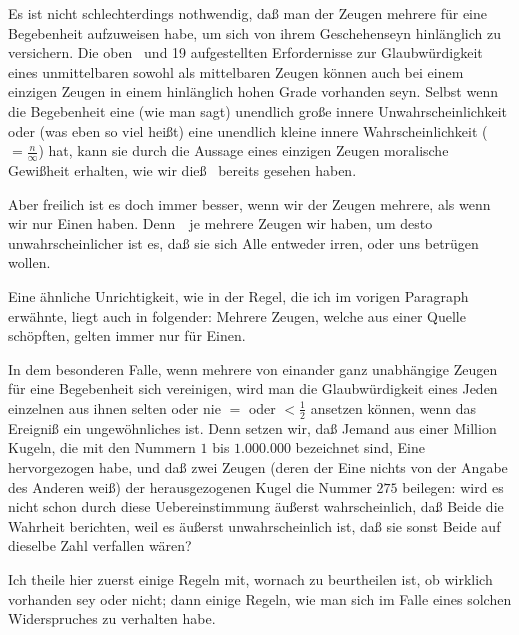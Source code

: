 \begin{aufza}
\item Es ist nicht schlechterdings nothwendig, daß man der Zeugen mehrere für eine Begebenheit aufzuweisen habe, um sich von ihrem Geschehenseyn hinlänglich zu versichern. Die oben \ und 19 aufgestellten Erfordernisse zur Glaubwürdigkeit eines unmittelbaren sowohl als mittelbaren Zeugen können auch bei einem einzigen Zeugen in einem hinlänglich hohen Grade vorhanden seyn. Selbst wenn die Begebenheit eine (wie man sagt) unendlich große innere Unwahrscheinlichkeit oder (was eben so viel heißt) eine unendlich kleine innere Wahrscheinlichkeit ($= \frac{n}{\infty}$) hat, kann sie durch die Aussage eines einzigen Zeugen moralische Gewißheit erhalten, wie wir dieß \ bereits gesehen haben.
\item Aber freilich ist es doch immer besser, wenn wir der Zeugen mehrere, als wenn wir nur Einen haben. Denn~\ je mehrere Zeugen wir haben, um desto unwahrscheinlicher ist es, daß sie sich Alle entweder irren, oder uns betrügen wollen.
\begin{RWanm} 
Eine ähnliche Unrichtigkeit, wie in der Regel, die ich im vorigen Paragraph erwähnte, liegt auch in folgender: Mehrere Zeugen, welche aus einer Quelle schöpften, gelten immer nur für Einen.
\end{RWanm}
\item In dem besonderen Falle, wenn mehrere von einander ganz unabhängige Zeugen für eine Begebenheit sich vereinigen, wird man die Glaubwürdigkeit eines Jeden einzelnen aus ihnen selten oder nie $=$ oder $< \frac{1}{2}$ ansetzen können, wenn das Ereigniß ein ungewöhnliches ist. Denn setzen wir, daß Jemand aus einer Million Kugeln, die mit den Nummern $1$ bis $1.000.000$ bezeichnet sind, Eine hervorgezogen habe, und daß zwei Zeugen (deren der Eine nichts von der Angabe des Anderen weiß) der herausgezogenen Kugel die Nummer $275$ beilegen: wird es nicht schon durch diese Uebereinstimmung äußerst wahrscheinlich, daß Beide die Wahrheit berichten, weil es äußerst unwahrscheinlich ist, daß sie sonst Beide auf dieselbe Zahl verfallen wären?
\end{aufza}


Ich theile hier zuerst einige Regeln mit, wornach zu beurtheilen ist, ob  wirklich vorhanden sey oder nicht; dann einige Regeln, wie man sich im Falle eines solchen Widerspruches zu verhalten habe.\par

